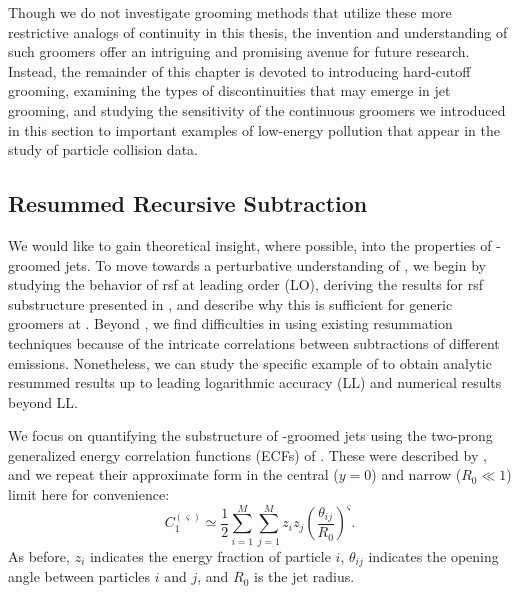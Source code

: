Though we do not investigate grooming methods that utilize these more restrictive analogs of continuity in this thesis, the invention and understanding of such groomers offer an intriguing and promising avenue for future research.
%
Instead, the remainder of this chapter is devoted to introducing hard-cutoff grooming, examining the types of discontinuities that may emerge in jet grooming, and studying the sensitivity of the continuous groomers we introduced in this section to important examples of low-energy pollution that appear in the study of particle collision data.




\subsection[Resummed Recursive Subtraction]{Resummed Recursive Subtraction}
\label{sec:pira-resummed}


We would like to gain theoretical insight, where possible, into the properties of \PIRANHA{}-groomed jets.
%
To move towards a perturbative understanding of \PIRANHA{}, we begin by studying the behavior of \gls{rsf} at leading order (LO), deriving the results for \gls{rsf} substructure presented in , and describe why this is sufficient for generic \PIRANHA{} groomers at .
%
Beyond , we find difficulties in using existing resummation techniques because of the intricate correlations between subtractions of different emissions.
%
Nonetheless, we can study the specific example of  to obtain analytic resummed results up to leading logarithmic accuracy (LL) and numerical results beyond LL.


We focus on quantifying the substructure of \PIRANHA{}-groomed jets using the two-prong generalized energy correlation functions (ECFs) of .
%
These were described by , and we repeat their approximate form in the central (\(y=0\)) and narrow (\(R_0 \ll 1\)) limit here for convenience:
\begin{equation}
    C_1^{(\varsigma)} \simeq \frac{1}{2}\sum_{i=1}^M\sum_{j=1}^M z_i z_j \left(\frac{\theta_{ij}}{R_0}\right)^\varsigma
    \label{eq:ECFdefn_repeat}
    .
\end{equation}
As before, \(z_i\) indicates the energy fraction of particle \(i\), \(\theta_{ij}\) indicates the opening angle between particles \(i\) and \(j\), and \(R_0\) is the jet radius.


